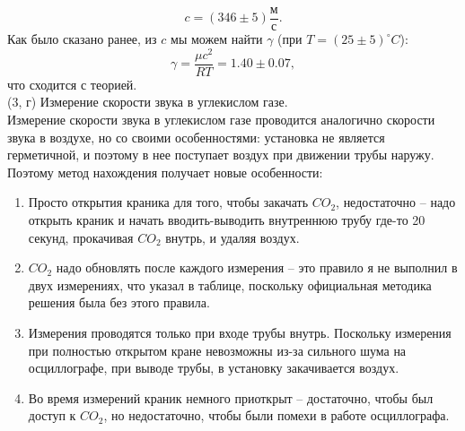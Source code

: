 $$c = (346\pm5)\frac{\text{м}}{\text{с}}.$$
Как было сказано ранее, из $c$ мы можем найти $\gamma$ (при $T = (25\pm 5)^\circ C$):
$$\gamma = \frac{\mu c^2}{RT} = 1.40 \pm 0.07,$$
что сходится с теорией.\\
(3, г) Измерение скорости звука в углекислом газе.\\
Измерение скорости звука в углекислом газе проводится аналогично скорости звука в воздухе, но со своими особенностями: установка не является герметичной, и поэтому в нее поступает воздух при движении трубы наружу. Поэтому метод нахождения получает новые особенности:
\begin{enumerate}
	\item Просто открытия краника для того, чтобы закачать $CO_2$, недостаточно -- надо открыть краник и начать вводить-выводить внутреннюю трубу где-то 20 секунд, прокачивая $CO_2$ внутрь, и удаляя воздух.
	\item $CO_2$ надо обновлять после каждого измерения -- это правило я не выполнил в двух измерениях, что указал в таблице, поскольку официальная методика решения была без этого правила.
	\item Измерения проводятся только при входе трубы внутрь. Поскольку измерения при полностью открытом кране невозможны из-за сильного шума на осциллографе, при выводе трубы, в установку закачивается воздух.
	\item Во время измерений краник немного приоткрыт -- достаточно, чтобы был доступ к $CO_2$, но недостаточно, чтобы были помехи в работе осциллографа.
\end{enumerate}


